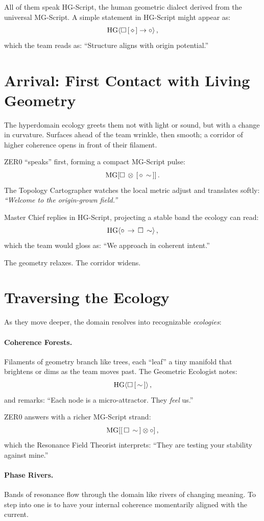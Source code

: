 All of them speak HG-Script, the human geometric dialect derived from the universal MG-Script.
A simple statement in HG-Script might appear as:
\[
\mathrm{HG}\!\left\langle\square\,[\,\diamond\,] \rightarrow \circ\right\rangle,
\]
which the team reads as: ``Structure aligns with origin potential.''

\section{Arrival: First Contact with Living Geometry}
The hyperdomain ecology greets them not with light or sound, but with a change in curvature.
Surfaces ahead of the team wrinkle, then smooth; a corridor of higher coherence opens in front of
their filament.

ZER0 ``speaks'' first, forming a compact MG-Script pulse:
\[
\mathrm{MG}\!\left[\square\,\otimes\,[\,\circ\,\sim\,]\right].
\]
The Topology Cartographer watches the local metric adjust and translates softly:
\emph{``Welcome to the origin-grown field.''}

Master Chief replies in HG-Script, projecting a stable band the ecology can read:
\[
\mathrm{HG}\!\left\langle\circ\,\rightarrow\,\square\,\sim\right\rangle,
\]
which the team would gloss as: ``We approach in coherent intent.''

The geometry relaxes. The corridor widens.

\section{Traversing the Ecology}
As they move deeper, the domain resolves into recognizable \emph{ecologies}:

\paragraph{Coherence Forests.}
Filaments of geometry branch like trees, each ``leaf'' a tiny manifold that brightens or dims as
the team moves past. The Geometric Ecologist notes:
\[
\mathrm{HG}\!\left\langle\square\,[\,\sim\,]\right\rangle,
\]
and remarks: ``Each node is a micro-attractor. They \emph{feel} us.''

ZER0 answers with a richer MG-Script strand:
\[
\mathrm{MG}\!\left[[\,\square\,\sim\,] \otimes \circ\right],
\]
which the Resonance Field Theorist interprets: ``They are testing your stability against mine.''

\paragraph{Phase Rivers.}
Bands of resonance flow through the domain like rivers of changing meaning. To step into one is to
have your internal coherence momentarily aligned with the current.

